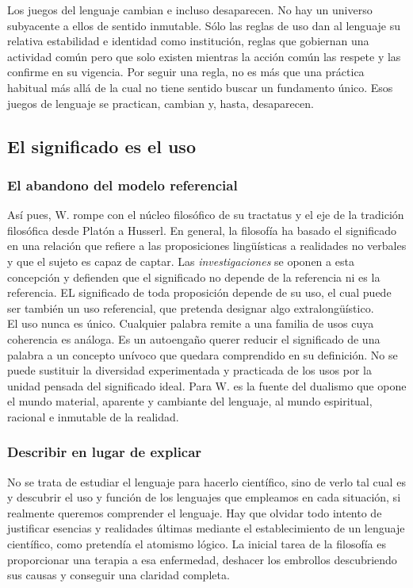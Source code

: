 \documentclass[a4paper, 11pt, twocolumn, spanish]{article}
\begin{document}
Los juegos del lenguaje cambian e incluso desaparecen. No hay un
universo subyacente a ellos de sentido inmutable. Sólo las reglas de
uso dan al lenguaje su relativa estabilidad e identidad como
institución, reglas que gobiernan una actividad común pero que solo
existen mientras la acción común las respete y las confirme en su
vigencia. Por seguir una regla, no es más que una práctica habitual
más allá de la cual no tiene sentido buscar un fundamento único. Esos
juegos de lenguaje se practican, cambian y, hasta, desaparecen.\\

\subsection{El significado es el uso}
\label{sec:org4d2d89c}
\subsubsection{El abandono del modelo referencial}
\label{sec:orgcc892c0}
Así pues, W. rompe con el núcleo filosófico de su tractatus y el eje
de la tradición filosófica desde Platón a Husserl. En general, la
filosofía ha basado el significado en una relación que refiere a las
proposiciones lingüísticas a realidades no verbales y que el sujeto es
capaz de captar. Las \emph{investigaciones} se oponen a esta concepción y
defienden que el significado no depende de la referencia ni es la
referencia. EL significado de toda proposición depende de su uso, el
cual puede ser también un uso referencial, que pretenda designar algo
extralongüístico.\\

El uso nunca es único. Cualquier palabra remite a una familia de usos
cuya coherencia es análoga. Es un autoengaño querer reducir el
significado de una palabra a un concepto unívoco que quedara
comprendido en su definición. No se puede sustituir la diversidad
experimentada y practicada de los usos por la unidad pensada del
significado ideal. Para W. es la fuente del dualismo que opone el
mundo material, aparente y cambiante del lenguaje, al mundo
espiritual, racional e inmutable de la realidad.

\subsubsection{Describir en lugar de explicar}
\label{sec:org3b8ff1f}
No se trata de estudiar el lenguaje para hacerlo científico, sino de
verlo tal cual es y descubrir el uso y función de los lenguajes que
empleamos en cada situación, si realmente queremos comprender el
lenguaje. Hay que olvidar todo intento de justificar esencias y
realidades últimas mediante el establecimiento de un lenguaje
científico, como pretendía el atomismo lógico. La inicial tarea de la
filosofía es proporcionar una terapia a esa enfermedad, deshacer los
embrollos descubriendo sus causas y conseguir una claridad completa.\\
\end{document}
